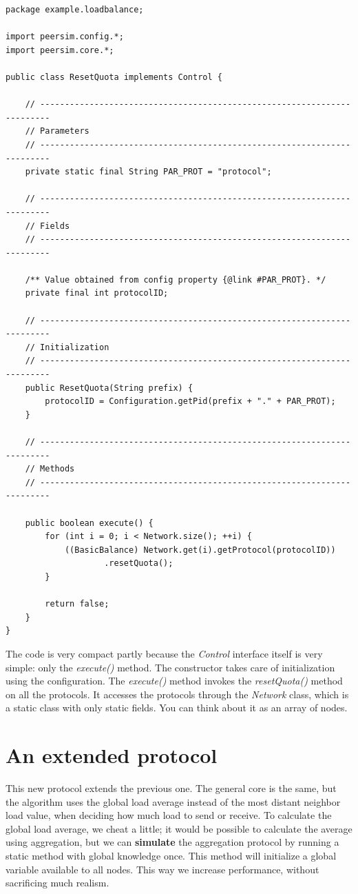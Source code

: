 \documentclass[a4paper,11pt]{article}
\begin{document}
\footnotesize
\begin{verbatim}
package example.loadbalance;

import peersim.config.*;
import peersim.core.*;

public class ResetQuota implements Control {

    // ------------------------------------------------------------------------
    // Parameters
    // ------------------------------------------------------------------------
    private static final String PAR_PROT = "protocol";

    // ------------------------------------------------------------------------
    // Fields
    // ------------------------------------------------------------------------

    /** Value obtained from config property {@link #PAR_PROT}. */
    private final int protocolID;

    // ------------------------------------------------------------------------
    // Initialization
    // ------------------------------------------------------------------------
    public ResetQuota(String prefix) {
        protocolID = Configuration.getPid(prefix + "." + PAR_PROT);
    }

    // ------------------------------------------------------------------------
    // Methods
    // ------------------------------------------------------------------------

    public boolean execute() {
        for (int i = 0; i < Network.size(); ++i) {
            ((BasicBalance) Network.get(i).getProtocol(protocolID))
                    .resetQuota();
        }

        return false;
    }
}
\end{verbatim}
\normalsize

The code is very compact partly because the \emph{Control} interface itself
is very simple: only the \emph{execute()} method. The constructor takes
care of initialization using the configuration. The \emph{execute()}
method invokes the \emph{resetQuota()} method on all the protocols.
It accesses the protocols through the \emph{Network} class, which is a
static class with only static fields.
You can think about it as an array of nodes.


\section{An extended protocol}

This new protocol extends the previous one. The general
core is the same, but the algorithm uses the global load average
instead of the most distant neighbor load value, when deciding
how much load to send or receive. To calculate
the global load average, we cheat a little; it would be possible
to calculate the average using aggregation, but we can \textbf{simulate}
the aggregation protocol by running
a static method with global knowledge once. This method will initialize
a global variable available to all nodes.
This way we increase performance, without sacrificing much realism.
\end{document}
